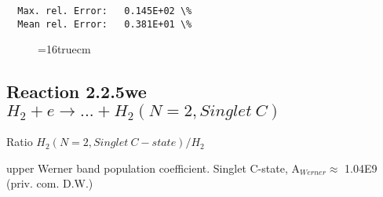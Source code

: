 \documentclass[12pt,dvipdfmx]{article}
\begin{document}
\begin{small}
\begin{verbatim}
  Max. rel. Error:   0.145E+02 \%
  Mean rel. Error:   0.381E+01 \%

\end{verbatim}\end{small}
\begin{figure} \label{2.2.5fu}
\epsfxsize=16truecm
\end{figure}

\newpage

\subsection{
Reaction 2.2.5we $H_2 + e \rightarrow ...+ H_2(N=2,Singlet \ C)$}

Ratio $H_2(N=2, Singlet \ C-state)/H_2 $

upper Werner band population coefficient. Singlet C-state, A$_{Werner} \approx $ 1.04E9 (priv. com. D.W.)
\end{document}
